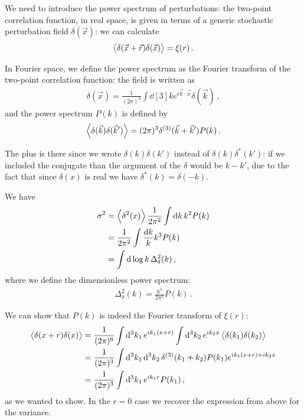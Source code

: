 \documentclass[main.tex]{subfiles}
\begin{document}
We need to introduce the power spectrum of perturbations: 
the two-point correlation function, in real space, is given in terms of a generic stochastic perturbation field \(\delta (\vec{x})\): we can calculate 
%
\begin{align}
\expval{ \delta (\vec{x} + \vec{r}) \delta (\vec{x})} = \xi (r)
\,.
\end{align}

In Fourier space, we define the power spectrum as the Fourier transform of the two-point correlation function: the field is written as 
%
\begin{align}
\delta (\vec{x}) = \frac{1}{(2\pi )^3} \int \dd[3]{k} e^{i \vec{k} \cdot \vec{x}} \delta (\vec{k})
\,,
\end{align}
%
and the power spectrum \(P(k)\) is defined by
%
\begin{align}
\expval{ \delta (\vec{k}) \delta (\vec{k}')} = (2\pi )^3 \delta^{(3)} (\vec{k} + \vec{k}') P(k)
\,.
\end{align}

The plus is there since we wrote \(\delta (k) \delta (k')\) instead of \(\delta(k) \delta^{*}(k')\): if we included the conjugate than the argument of the \(\delta \) would be \(k - k'\), due to the fact that since \(\delta (x)\) is real we have \(\delta^{*}(k) = \delta (-k)\). 

We have 
%
\begin{align}
\sigma^2 &= \expval{ \delta^2(x)} \frac{1}{2 \pi^2} \int \dd{k} k^2 P(k)  \\
&= \frac{1}{2 \pi^2} \int \frac{ \dd{k}}{k} k^3 P(k)  \\
&= \int \dd{\log k } \Delta^2_\delta  (k)
\,,
\end{align}
%
where we define the dimensionless power spectrum: 
%
\begin{align}
\Delta^2_\delta (k) = \frac{k^3}{2 \pi^2} P(k)
\,.
\end{align}

We can show that \(P(k)\) is indeed the Fourier transform of \(\xi (r)\): 
%
\begin{align}
\expval{ \delta (x+r) \delta (x)} &= \frac{1}{(2 \pi )^6}
\int \dd[3]{k_1 } e^{i k_1 (x+r)} \int \dd[3]{k_2 } e^{i k_2 x} 
\expval{\delta (k_1 ) \delta (k_2 )}  \\
&= \frac{1}{(2 \pi )^3} \int \dd[3]{k_1 } \dd[3]{k_2 } \delta^{(3)} (k_1 + k_2 ) P(k_1 ) e^{i k_1 (x+r) + i k_2 x}  \\
&= \frac{1}{(2 \pi )^3} \int \dd[3]{k_1 } e^{i k_1 r} P(k_1 )
\,,
\end{align}
%
as we wanted to show. 
In the \(r = 0\) case we recover the expression from above for the variance. 
\end{document}
